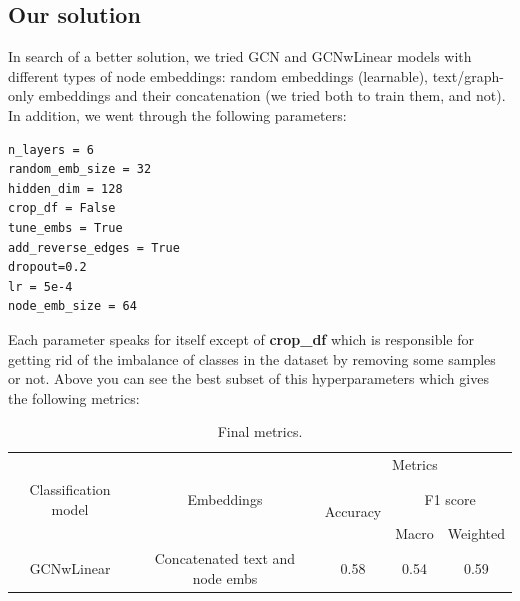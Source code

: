 \subsection{Our solution}
In search of a better solution, we tried GCN and GCNwLinear models with different types of node embeddings: random embeddings (learnable), text/graph-only embeddings and their concatenation (we tried both to train them, and not). In addition, we went through the following parameters:
\begin{verbatim}
n_layers = 6
random_emb_size = 32
hidden_dim = 128
crop_df = False
tune_embs = True
add_reverse_edges = True
dropout=0.2
lr = 5e-4
node_emb_size = 64
\end{verbatim}
Each parameter speaks for itself except of \textbf{crop\_df} which is responsible for getting rid of the imbalance of classes in the dataset by removing some samples or not. Above you can see the best subset of this hyperparameters which gives the following metrics:
\begin{table}[h]
\centering
\begin{tabular}{c c  c c c}
\hline\hline
 & & \multicolumn{3}{c}{Metrics} \\
\cline{3-5}
Classification model & Embeddings & \multirow{2}{*}{Accuracy} & \multicolumn{2}{c}{F1 score} \\
 & & & Macro & Weighted \\
\hline
\multirow{1}{*}{GCNwLinear} & Concatenated text and node embs & 0.58 & 0.54 & 0.59 \\
\hline
\end{tabular}
\caption{Final metrics.}
\label{table:final_metrics}
\end{table}
